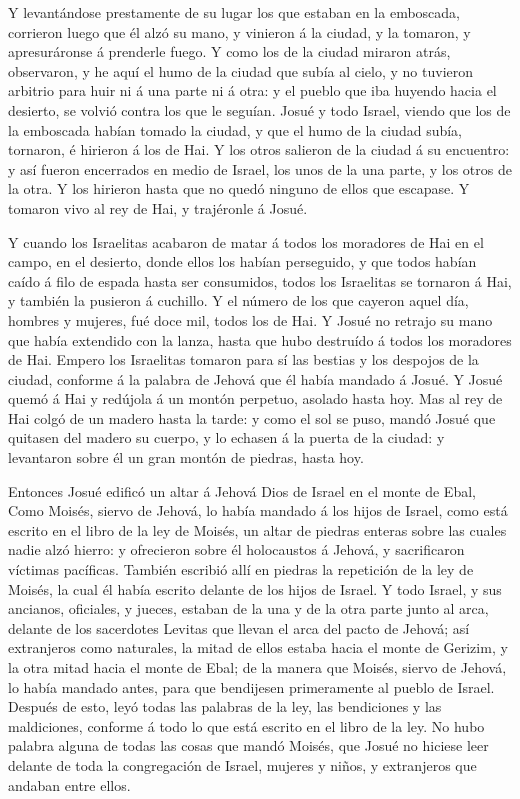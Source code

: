  Y levantándose prestamente de su lugar los que estaban en
la emboscada, corrieron luego que él alzó su mano, y vinieron á la
ciudad, y la tomaron, y apresuráronse á prenderle fuego.  Y
como los de la ciudad miraron atrás, observaron, y he aquí el humo de la
ciudad que subía al cielo, y no tuvieron arbitrio para huir ni á una
parte ni á otra: y el pueblo que iba huyendo hacia el desierto, se
volvió contra los que le seguían.  Josué y todo Israel,
viendo que los de la emboscada habían tomado la ciudad, y que el humo de
la ciudad subía, tornaron, é hirieron á los de Hai.  Y los
otros salieron de la ciudad á su encuentro: y así fueron encerrados en
medio de Israel, los unos de la una parte, y los otros de la otra. Y los
hirieron hasta que no quedó ninguno de ellos que escapase. 
Y tomaron vivo al rey de Hai, y trajéronle á Josué.

 Y cuando los Israelitas acabaron de matar á todos los
moradores de Hai en el campo, en el desierto, donde ellos los habían
perseguido, y que todos habían caído á filo de espada hasta ser
consumidos, todos los Israelitas se tornaron á Hai, y también la
pusieron á cuchillo.  Y el número de los que cayeron aquel
día, hombres y mujeres, fué doce mil, todos los de Hai.  Y
Josué no retrajo su mano que había extendido con la lanza, hasta que
hubo destruído á todos los moradores de Hai.  Empero los
Israelitas tomaron para sí las bestias y los despojos de la ciudad,
conforme á la palabra de Jehová que él había mandado á Josué.
 Y Josué quemó á Hai y redújola á un montón perpetuo,
asolado hasta hoy.  Mas al rey de Hai colgó de un madero
hasta la tarde: y como el sol se puso, mandó Josué que quitasen del
madero su cuerpo, y lo echasen á la puerta de la ciudad: y levantaron
sobre él un gran montón de piedras, hasta hoy.

 Entonces Josué edificó un altar á Jehová Dios de Israel en
el monte de Ebal,  Como Moisés, siervo de Jehová, lo había
mandado á los hijos de Israel, como está escrito en el libro de la ley
de Moisés, un altar de piedras enteras sobre las cuales nadie alzó
hierro: y ofrecieron sobre él holocaustos á Jehová, y sacrificaron
víctimas pacíficas.  También escribió allí en piedras la
repetición de la ley de Moisés, la cual él había escrito delante de los
hijos de Israel.  Y todo Israel, y sus ancianos, oficiales,
y jueces, estaban de la una y de la otra parte junto al arca, delante de
los sacerdotes Levitas que llevan el arca del pacto de Jehová; así
extranjeros como naturales, la mitad de ellos estaba hacia el monte de
Gerizim, y la otra mitad hacia el monte de Ebal; de la manera que
Moisés, siervo de Jehová, lo había mandado antes, para que bendijesen
primeramente al pueblo de Israel.  Después de esto, leyó
todas las palabras de la ley, las bendiciones y las maldiciones,
conforme á todo lo que está escrito en el libro de la ley. 
No hubo palabra alguna de todas las cosas que mandó Moisés, que Josué no
hiciese leer delante de toda la congregación de Israel, mujeres y niños,
y extranjeros que andaban entre ellos.

